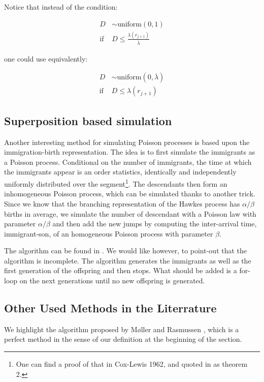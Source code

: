 \begin{remarque}
Notice that instead of the condition:

\begin{align*}
D & \sim \text{uniform}(0,1) \\
\text{if } & D \leq \frac {\lambda( r_{j+1} ) } { \overline{\lambda} } 
\end{align*}


one could use equivalently:

\begin{align*}
D & \sim \text{uniform}(0, \overline{\lambda}) \\
\text{if } & D \leq \lambda( r_{j+1} ) 
\end{align*}


\end{remarque}



\subsection{Superposition based simulation}
Another interesting method for simulating Poisson processes is based upon the immigration-birth representation. The idea is to first simulate the immigrants as a Poisson process. Conditional on the number of immigrants, the time at which the immigrants appear is an order statistics, identically and independently uniformly distributed over the segment\footnote{One can find a proof of that in Cox-Lewis 1962, and quoted in \cite{gen_nonhomo_poisson} as theorem 2.}. The descendants then form an inhomogeneous Poisson process, which can be simulated thanks to another trick. Since we know that the branching representation of the Hawkes process has $\alpha / \beta $ births in average, we simulate the number of descendant with a Poisson law with parameter $\alpha / \beta$ and then add the new jumps by computing the inter-arrival time, immigrant-son, of an homogeneous Poisson process with parameter $\beta$.

The algorithm can be found in \cite{simullaub}. We would like however, to point-out that the algorithm is incomplete. The algorithm generates the immigrants as well as the first generation of the offspring and then stops. What should be added is a for-loop on the next generations until no new offspring is generated.




\subsection{Other Used Methods in the Literrature}
We highlight the algorithm proposed by Møller and Rasmussen \cite{rasmussen}, which is a perfect method in the sense of our definition at the beginning of the section.

